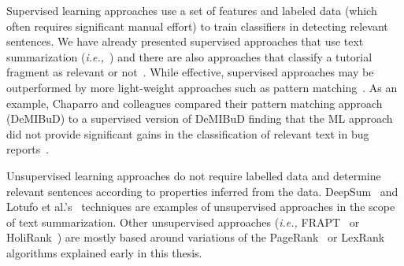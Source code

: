 Supervised learning approaches use a set of features and labeled data (which often requires significant manual effort) to train classifiers in detecting relevant sentences.
We have already presented supervised approaches that use text summarization (\textit{i.e.,}~\cite{Rastkar2010})
and there are also approaches that classify a tutorial fragment as relevant or not~\cite{Jiang2016b}.
While effective, supervised approaches may be outperformed by more light-weight approaches such as 
pattern matching~\cite{Bavota2016}.
As an example, Chaparro    
and colleagues 
compared their pattern matching approach ({\small DeMIBuD}) to a supervised version of {\small DeMIBuD} finding that the 
ML approach did not provide significant gains in the classification of relevant text in bug reports~\cite{Chaparro2017}.



Unsupervised learning approaches do not require labelled data and determine relevant sentences according to properties inferred from the data. DeepSum~\cite{Li2018} and Lotufo et al.'s~\cite{Lotufo2012} techniques are examples of unsupervised approaches in the scope of text summarization. Other unsupervised approaches (\textit{i.e.,} {\small FRAPT}~\cite{Jiang2017} or HoliRank~\cite{Ponzanelli2015, Ponzanelli2017}) are mostly based around variations of the PageRank~\cite{Page1999} or LexRank~\cite{Erkan2004} algorithms explained early in this thesis. 



